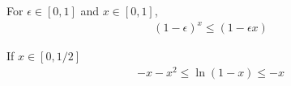 \begin{lemma}
For $\epsilon \in [0,1]$ and $x \in [0,1]$, 
\begin{align*}
(1-\epsilon)^x \leq (1-\epsilon x)
\end{align*}\label{lemma:epsilon}
\end{lemma}

\begin{lemma}
If $x \in [0,1/2]$
\begin{align*}
-x-x^2 \leq \ln (1-x) \leq -x
\end{align*}\label{lemma:ln}
\end{lemma}


%
%
%
%
